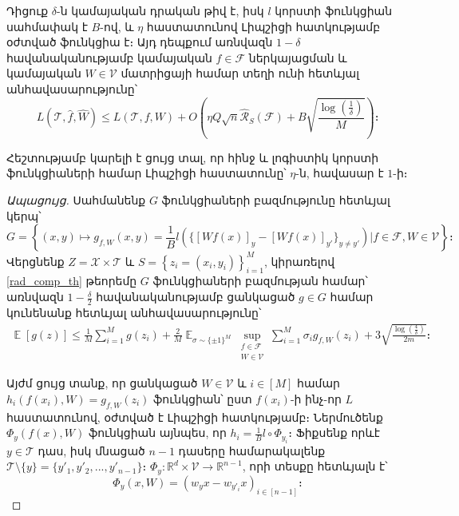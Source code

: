 \documentclass[12pt]{article}
\DeclareMathOperator*{\E}{\mathbb{E}}
\begin{document}
\begin{lemma}
\label{rad_lemma_main}
Դիցուք $\delta$-ն կամայական դրական թիվ է, իսկ $l$ կորստի ֆունկցիան սահմափակ է $B$-ով, և $\eta$ հաստատունով Լիպշիցի հատկությամբ օժտված ֆունկցիա է։ Այդ դեպքում առնվազն $1-\delta$ հավանականությամբ կամայական $f \in \mathcal{F}$ ներկայացման և կամայական $W \in \mathcal{V}$ մատրիցայի համար տեղի ունի հետևյալ անհավասարությունը՝
$$L(\mathcal{T}, \hat{f}, \hat{W}) \leq L(\mathcal{T}, f, W) +O\left( \eta Q\sqrt{n} \hat{\mathcal{R}}_S(\mathcal{F})+    B\sqrt{\frac{\log \left( \frac{1}{\delta} \right)}{M}} \right)։$$
\end{lemma}
 Հեշտությամբ կարելի է ցույց տալ, որ հինջ և լոգիստիկ կորստի ֆունկցիաների համար Լիպշիցի հաստատունը՝ $\eta$-ն, հավասար  է $1$-ի։
\begin{proof}[Ապացույց]
   Սահմանենք $G$ ֆունկցիաների բազմությունը հետևյալ կերպ՝
$$G = \left \{ (x, y) \mapsto  g_{f, W}(x, y) = \frac{1}{B}l(\{[Wf(x)]_y - [Wf(x)]_{y'}\}_{y\neq y'}   ) | f \in \mathcal{F}, W \in \mathcal{V} \right \}։$$
Վերցնենք $Z = \mathcal{X} \times \mathcal{T}$ և $S = \left \{z_i = (x_i, y_i) \right \}_{i=1}^M$, կիրառելով \ref{rad_comp_th} թեորեմը $G$ ֆունկցիաների բազմության համար՝ առնվազն $1-\frac{\delta}{2}$ հավանականությամբ ցանկացած $g \in G$ համար կունենանք հետևյալ անհավասարությունը՝
\begin{align}
\label{rad_ineq_1}
\E[g(z)] \leq \frac{1}{M}\sum_{i=1}^Mg(z_i) + \frac{2}{M}\E_{\sigma \sim \{\pm1\}^M} \sup_{\substack{ f  \in \mathcal{F}  \\ W \in \mathcal{V}}}\sum_{i=1}^M \sigma_ig_{f,W}(z_i) +    3\sqrt{\frac{\log \left( \frac{4}{\delta} \right)}{2m}}։
\end{align}

Այժմ ցույց տանք, որ ցանկացած $W \in \mathcal{V}$  և $i \in [M]$ համար $h_i(f(x_i), W) = g_{f,W}(z_i)$ ֆունկցիան՝ ըստ $f(x_i)$-ի ինչ-որ $L$ հաստատունով, օժտված է Լիպշիցի հատկությամբ։ Ներմուծենք $\Phi_y(f(x), W)$ ֆունկցիան այնպես, որ $h_i = \frac{1}{B} l \circ \Phi_{y_i}$։ Ֆիքսենք որևէ $y \in \mathcal{T}$ դաս, իսկ մնացած $n-1$ դասերը համարակալենք  $\mathcal{T} \setminus \{y\} =\{y'_1, y'_2, ..., y'_{n-1}\} $։ $\Phi_y : \mathbb{R}^d \times \mathcal{V} \rightarrow \mathbb{R}^{n-1}$, որի տեսքը հետևյալն է՝
$$\Phi_y(x, W) = (w_yx-w_{y'_{i}}x)_{i \in [n-1]}։$$


\end{proof}
\end{document}
